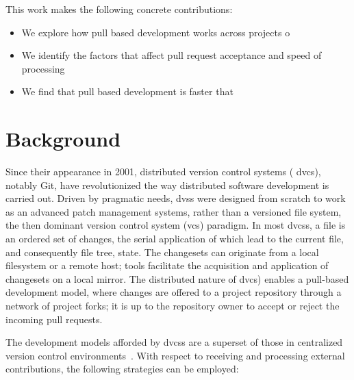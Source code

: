 \documentclass{sig-alternate}
\begin{document}
This work makes the following concrete contributions\todo{}:

\begin{itemize}

  \item We explore how pull based development works across projects o

  \item We identify the factors that affect pull request acceptance and
    speed of processing

  \item We find that pull based development is faster that 

\end{itemize}


\section{Background}
\label{sec:bg}
Since their appearance in 2001, distributed version control systems ({\sc
dvcs}), notably Git, have revolutionized the way distributed software
development is carried out. Driven by pragmatic needs, {\sc dvs}s were designed
from scratch to work as an advanced patch management systems, rather than a
versioned file system, the then dominant version control system ({\sc vcs})
paradigm. In most {\sc dvcs}s, a file is an ordered set of changes, the serial
application of which lead to the current file, and consequently file tree,
state. The changesets can originate from a local filesystem or a remote host;
tools facilitate the acquisition and application of changesets on a local
mirror. The distributed nature of {\sc dvcs}) enables a pull-based development
model, where changes are offered to a project repository through a network of
project forks; it is up to the repository owner to accept or reject the incoming
pull requests.

The development models afforded by {\sc dvcs}s are a superset of 
those in centralized version control environments~\cite{Shiha12,Bird09}. 
With respect to receiving and processing external contributions,
the following strategies can be employed:
\end{document}
